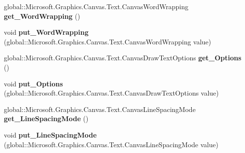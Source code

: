 \begin{DoxyCompactItemize}
\item 
\mbox{\label{class_microsoft_1_1_graphics_1_1_canvas_1_1_text_1_1_canvas_text_layout_ac9ac19d596092af238584ca5fb4d4406}} 
global\+::\+Microsoft.\+Graphics.\+Canvas.\+Text.\+Canvas\+Word\+Wrapping {\bfseries get\+\_\+\+Word\+Wrapping} ()
\item 
\mbox{\label{class_microsoft_1_1_graphics_1_1_canvas_1_1_text_1_1_canvas_text_layout_ad00875174765b3f2e3c1294ce86a36eb}} 
void {\bfseries put\+\_\+\+Word\+Wrapping} (global\+::\+Microsoft.\+Graphics.\+Canvas.\+Text.\+Canvas\+Word\+Wrapping value)
\item 
\mbox{\label{class_microsoft_1_1_graphics_1_1_canvas_1_1_text_1_1_canvas_text_layout_a1c7fdcf691594d0a65ccb802ba2da272}} 
global\+::\+Microsoft.\+Graphics.\+Canvas.\+Text.\+Canvas\+Draw\+Text\+Options {\bfseries get\+\_\+\+Options} ()
\item 
\mbox{\label{class_microsoft_1_1_graphics_1_1_canvas_1_1_text_1_1_canvas_text_layout_ad2eb965b4419db8c2fc551212750ef9e}} 
void {\bfseries put\+\_\+\+Options} (global\+::\+Microsoft.\+Graphics.\+Canvas.\+Text.\+Canvas\+Draw\+Text\+Options value)
\item 
\mbox{\label{class_microsoft_1_1_graphics_1_1_canvas_1_1_text_1_1_canvas_text_layout_a80e906d0512252d17b70c935fcc440a5}} 
global\+::\+Microsoft.\+Graphics.\+Canvas.\+Text.\+Canvas\+Line\+Spacing\+Mode {\bfseries get\+\_\+\+Line\+Spacing\+Mode} ()
\item 
\mbox{\label{class_microsoft_1_1_graphics_1_1_canvas_1_1_text_1_1_canvas_text_layout_a99b5936e69b1769d738e3d0437fa745d}} 
void {\bfseries put\+\_\+\+Line\+Spacing\+Mode} (global\+::\+Microsoft.\+Graphics.\+Canvas.\+Text.\+Canvas\+Line\+Spacing\+Mode value)
\item 
\mbox{\label{class_microsoft_1_1_graphics_1_1_canvas_1_1_text_1_1_canvas_text_layout_a5c236351aff1b822b001c6d58d99a4ef}} 

\end{DoxyCompactItemize}
